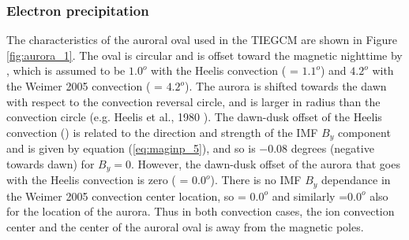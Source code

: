\subsubsection{Electron precipitation  }\label{cap:aurora_elecprecip}
%
The characteristics of the auroral oval used in the TIEGCM are shown 
in Figure \ref{fig:aurora_1}. The oval is circular and is offset
toward the magnetic nighttime by , which is assumed to be $1.0^o$
with the Heelis convection ( = $1.1^o$) and $4.2^o$ with the
Weimer 2005 convection ( = $4.2^o$).
The aurora is shifted towards the dawn with respect to the convection
reversal circle, and is larger in radius than the convection circle
(e.g. Heelis et al., 1980 \cite{Heelis1980}).
The dawn-dusk offset of the Heelis convection () is related
to the direction and strength of the IMF $B_y$ component and is given by
equation (\ref{eq:maginp_5}), and so is $-0.08$ degrees (negative towards dawn) 
for $B_y=0$.  However, the dawn-dusk offset of the aurora that
goes with the Heelis convection is zero ( = $0.0^o$).  There
is no IMF $B_y$ dependance in the Weimer 2005 convection center location,
so  = $0.0^o$ and similarly  =$ 0.0^o$ also for
the location of the aurora.  Thus in both convection cases, the ion
convection center and the center of the auroral oval is away from the
magnetic poles. \\

